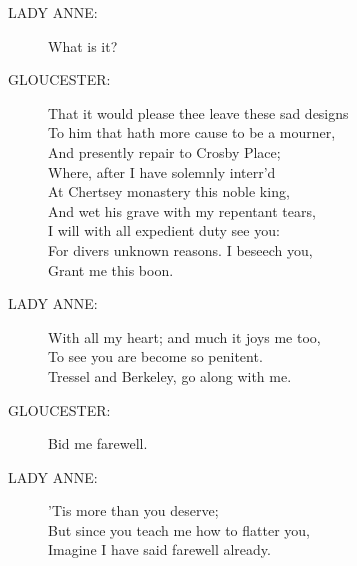 \documentclass{article}
\begin{document}
\begin{description}
\item[LADY ANNE:] 
\hspace{1pt}What is it?\\
\end{description}
\begin{description}
\item[GLOUCESTER:] 
\hspace{1pt}That it would please thee leave these sad designs\\
\hspace{1pt}To him that hath more cause to be a mourner,\\
\hspace{1pt}And presently repair to Crosby Place;\\
\hspace{1pt}Where, after I have solemnly interr'd\\
\hspace{1pt}At Chertsey monastery this noble king,\\
\hspace{1pt}And wet his grave with my repentant tears,\\
\hspace{1pt}I will with all expedient duty see you:\\
\hspace{1pt}For divers unknown reasons. I beseech you,\\
\hspace{1pt}Grant me this boon.\\
\end{description}
\begin{description}
\item[LADY ANNE:] 
\hspace{1pt}With all my heart; and much it joys me too,\\
\hspace{1pt}To see you are become so penitent.\\
\hspace{1pt}Tressel and Berkeley, go along with me.\\
\end{description}
\begin{description}
\item[GLOUCESTER:] 
\hspace{1pt}Bid me farewell.\\
\end{description}
\begin{description}
\item[LADY ANNE:] 
\hspace{1pt}'Tis more than you deserve;\\
\hspace{1pt}But since you teach me how to flatter you,\\
\hspace{1pt}Imagine I have said farewell already.\\
\end{description}
\end{document}
